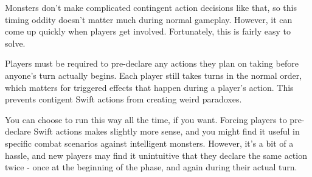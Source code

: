     Monsters don't make complicated contingent action decisions like that, so this timing oddity doesn't matter much during normal gameplay.
    However, it can come up quickly when players get involved.
    Fortunately, this is fairly easy to solve.

    Players must be required to pre-declare any  actions they plan on taking before anyone's turn actually begins.
    Each player still takes turns in the normal order, which matters for triggered effects that happen during a player's action.
    This prevents contigent Swift actions from creating weird paradoxes.

    You can choose to run this way all the time, if you want.
    Forcing players to pre-declare Swift actions makes slightly more sense, and you might find it useful in specific combat scenarios against intelligent monsters.
    However, it's a bit of a hassle, and new players may find it unintuitive that they declare the same action twice - once at the beginning of the phase, and again during their actual turn.
